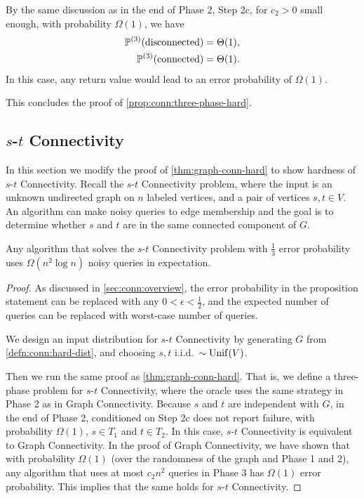 By the same discussion as in the end of Phase 2, Step 2c, for $c_2>0$ small enough, with probability $\Omega(1)$, we have
\begin{align*}
  \mathbb{P}^{(3)}(\text{disconnected}) &= \Theta(1), \\
  \mathbb{P}^{(3)}(\text{connected}) &= \Theta(1).
\end{align*}
In this case, any return value would lead to an error probability of $\Omega(1)$.

This concludes the proof of \cref{prop:conn:three-phase-hard}.

\subsection{\texorpdfstring{$s$-$t$}{s-t} Connectivity} \label{sec:conn:s-t}
In this section we modify the proof of \cref{thm:graph-conn-hard} to show hardness of $s$-$t$ Connectivity.
Recall the $s$-$t$ Connectivity problem, where the input is an unknown undirected graph on $n$ labeled vertices, and a pair of vertices $s,t \in V$. An algorithm can make noisy queries to edge membership and the goal is to determine whether $s$ and $t$ are in the same connected component of $G$.

\begin{proposition} \label{prop:s-t-conn-hard}
  Any algorithm that solves the $s$-$t$ Connectivity problem with $\frac 13$ error probability uses $\Omega(n^2\log n)$ noisy queries in expectation.
\end{proposition}

\begin{proof}
  As discussed in \cref{sec:conn:overview}, the error probability in the proposition statement can be replaced with any $0<\epsilon<\frac 12$, and the expected number of queries can be replaced with worst-case number of queries.

  We design an input distribution for $s$-$t$ Connectivity by generating $G$ from \cref{defn:conn:hard-dist}, and choosing $s,t$ i.i.d.~$\sim \operatorname{\mathrm{Unif}}(V)$.

  Then we run the same proof as \cref{thm:graph-conn-hard}.
  That is, we define a three-phase problem for $s$-$t$ Connectivity, where the oracle uses the same strategy in Phase 2 as in Graph Connectivity.
  Because $s$ and $t$ are independent with $G$, in the end of Phase 2, conditioned on Step 2c does not report failure, with probability $\Omega(1)$, $s\in T_1$ and $t\in T_2$.
  In this case, $s$-$t$ Connectivity is equivalent to Graph Connectivity.
  In the proof of Graph Connectivity, we have shown that with probability $\Omega(1)$ (over the randomness of the graph and Phase 1 and 2), any algorithm that uses at most $c_2 n^2$ queries in Phase 3 has $\Omega(1)$ error probability.
  This implies that the same holds for $s$-$t$ Connectivity.
\end{proof}
